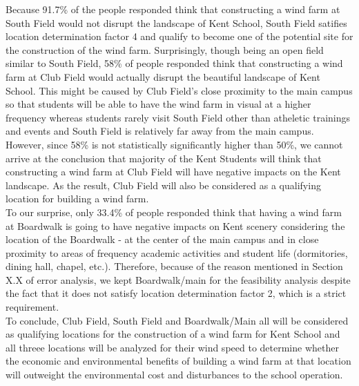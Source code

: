 \documentclass[review]{elsarticle}
\begin{document}
Because 91.7\% of the people responded think that constructing a wind farm at South Field would not disrupt the landscape of Kent School, South Field satifies location determination factor 4 
and qualify to become one of the potential site for the construction of the wind farm. Surprisingly, though being an open field similar to South Field, 58\% of people responded think that constructing
a wind farm at Club Field would actually disrupt the beautiful landscape of Kent School. This might be caused by Club Field's close proximity to the main campus so that students will be able to 
have the wind farm in visual at a higher frequency whereas students rarely visit South Field other than atheletic trainings and events and South Field is relatively far away from the main campus. 
However, since 58\% is not statistically significantly higher than 50\%, we cannot arrive at the conclusion that majority of the Kent Students will think that constructing a wind farm at Club Field 
will have negative impacts on the Kent landscape. As the result, Club Field will also be considered as a qualifying location for building a wind farm.
\\\indent To our surprise, only 33.4\% of people responded think that having a wind farm at Boardwalk is going to have negative impacts on Kent scenery considering the location of the Boardwalk - at the center of 
the main campus and in close proximity to areas of frequency academic activities and student life (dormitories, dining hall, chapel, etc.). Therefore, because of the reason mentioned in Section X.X of 
error analysis, we kept Boardwalk/main for the feasibility analysis despite the fact that it does not satisfy location determination factor 2, which is a strict requirement.
\\\indent To conclude, Club Field, South Field and Boardwalk/Main all will be considered as qualifying locations for the construction of a wind farm for Kent School and all threee locations will be analyzed 
for their wind speed to determine whether the economic and environmental benefits of building a wind farm at that location will outweight the environmental cost and disturbances to the school operation.

\clearpage


\end{document}
